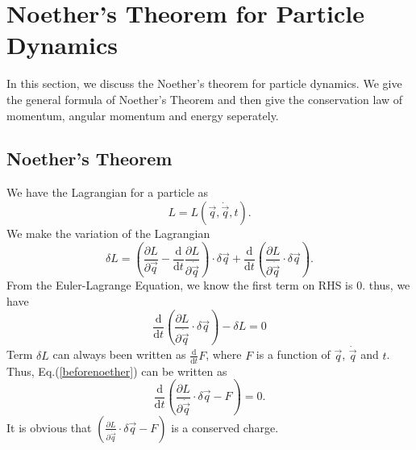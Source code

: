 \documentclass[%
 reprint,
 amsmath,amssymb,
 aps,
]{revtex4-1}
\begin{document}
\section{Noether's Theorem for Particle Dynamics}
In this section, we discuss the Noether's theorem for particle dynamics. We give the general formula of Noether's Theorem and then give the conservation law of momentum, angular momentum and energy seperately.
\subsection{Noether's Theorem}
We have the Lagrangian for a particle as
\begin{equation}
    L=L(\vec{q},\dot{\vec{q}},t).
\end{equation}
We make the variation of the Lagrangian
\begin{equation}
    \delta L=(\frac{\partial L}{\partial \vec{q}}-\frac{\mathrm{d}}{\mathrm{d}t}\frac{\partial L}{\partial\dot{\vec{q}}})\cdot\delta\vec{q}+\frac{\mathrm{d}}{\mathrm{d}t}(\frac{\partial L}{\partial \dot{\vec{q}}}\cdot\delta\vec{q}).
\end{equation}
From the Euler-Lagrange Equation, we know the first term on RHS is $0$. thus, we have
\begin{equation}
    \frac{\mathrm{d}}{\mathrm{d}t}(\frac{\partial L}{\partial \dot{\vec{q}}}\cdot\delta\vec{q})-\delta L=0
    \label{beforenoether}
\end{equation}
Term $\delta L$ can always been written as $\frac{\mathrm{d}}{\mathrm{d}t}F$, where $F$ is a function of $\vec{q}$, $\dot{\vec{q}}$ and $t$. Thus, Eq.(\ref{beforenoether}) can be written as
\begin{equation}
    \frac{\mathrm{d}}{\mathrm{d}t}(\frac{\partial L}{\partial \dot{\vec{q}}}\cdot\delta\vec{q}-F)=0.
\label{noether'stheorem}
\end{equation}
It is obvious that $(\frac{\partial L}{\partial \dot{\vec{q}}}\cdot\delta\vec{q}-F)$ is a conserved charge.
\end{document}
